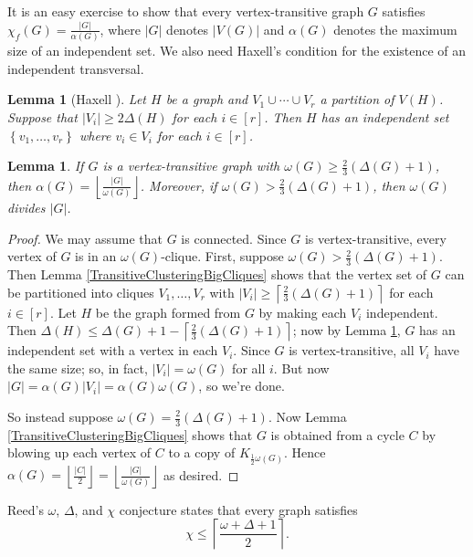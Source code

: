 \documentclass[12pt]{article}
\theoremstyle{plain}
\newtheorem{lem}[thm]{Lemma}
\theoremstyle{definition}
\theoremstyle{remark}
\newcommand{\set}[1]{\left\{ #1 \right\}}
\newcommand{\card}[1]{\left|#1\right|}
\newcommand{\ceil}[1]{\left\lceil#1\right\rceil}
\newcommand{\floor}[1]{\left\lfloor#1\right\rfloor}
\newcommand{\irange}[1]{\left[#1\right]}
\newcommand{\parens}[1]{\left( #1 \right)}
\begin{document}
It is an easy exercise to show that every vertex-transitive graph $G$ satisfies
$\chi_f(G) = \frac{|G|}{\alpha(G)}$, where $|G|$ denotes $|V(G)|$ and
$\alpha(G)$ denotes the maximum size of an independent set. We also need
Haxell's condition \cite{haxell2001note} for the
existence of an independent transversal.

\begin{lem}[Haxell \cite{haxell2001note}]
\label{HaxellTransversal}
Let $H$ be a graph and $V_1 \cup \cdots \cup V_r$ a partition of $V(H)$. 
Suppose that $\card{V_i} \geq 2\Delta(H)$ for each $i \in \irange{r}$. Then $H$ has an independent set $\set{v_1, \ldots, v_r}$
where $v_i \in V_i$ for each $i \in \irange{r}$.
\end{lem}

\begin{lem}\label{TransitiveFractionalColoringWithBigCliques}
If $G$ is a vertex-transitive graph with $\omega(G) \ge \frac23 \parens{\Delta(G) + 1}$, then $\alpha(G) = \floor{\frac{|G|}{\omega(G)}}$.  Moreover, if $\omega(G) > \frac23 \parens{\Delta(G) + 1}$, then $\omega(G)$ divides $|G|$.
\end{lem}
\begin{proof}
We may assume that $G$ is connected. Since $G$ is vertex-transitive, every
vertex of $G$ is in an $\omega(G)$-clique. First, suppose $\omega(G) > \frac23
\parens{\Delta(G) + 1}$.  Then Lemma \ref{TransitiveClusteringBigCliques} shows
that the vertex set of $G$ can be partitioned into cliques $V_1, \ldots, V_r$
with $|V_i| \ge \ceil{\frac23 \parens{\Delta(G) + 1}}$ for each $i \in
\irange{r}$.  Let $H$ be the graph formed from $G$ by making each $V_i$
independent.  Then $\Delta(H) \le \Delta(G) + 1 - \ceil{\frac23
\parens{\Delta(G) + 1}}$; now by Lemma \ref{HaxellTransversal}, $G$ has
an independent set with a vertex in each $V_i$.  Since $G$ is vertex-transitive,
all $V_i$ have the same size; so, in fact, $\card{V_i}=\omega(G)$ for all $i$.
But now $\card{G} = \alpha(G)\card{V_i}=\alpha(G)\omega(G)$, so we're done.

So instead suppose $\omega(G) = \frac23 \parens{\Delta(G) + 1}$.  Now Lemma
\ref{TransitiveClusteringBigCliques} shows that $G$ is obtained from a cycle
$C$ by blowing up each vertex of $C$ to a copy of $K_{\frac12 \omega(G)}$. 
Hence $\alpha(G) = \floor{\frac{|C|}{2}} = \floor{\frac{|G|}{\omega(G)}}$ as
desired.
\end{proof}

Reed's $\omega$, $\Delta$, and $\chi$ conjecture states that every graph
satisfies 
\[\chi \leq\ceil{\frac{\omega + \Delta + 1}{2}}.\]
\end{document}

